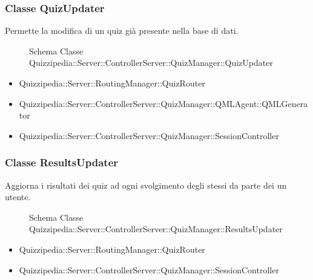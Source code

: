 \subsubsection{Classe QuizUpdater}
Permette la modifica di un quiz già presente nella base di dati.
\begin{figure}[H]
\centering
\noindent{}
\caption{Schema Classe Quizzipedia::Server::ControllerServer::QuizManager::QuizUpdater}
\end{figure}
\begin{itemize}
\item Quizzipedia::Server::RoutingManager::QuizRouter
\end{itemize}
\begin{itemize}
\item Quizzipedia::Server::ControllerServer::QuizManager::QMLAgent::QMLGenerator
\item Quizzipedia::Server::ControllerServer::QuizManager::SessionController
\end{itemize}
\subsubsection{Classe ResultsUpdater}
Aggiorna i risultati dei quiz ad ogni svolgimento degli stessi da parte dei un utente.
\begin{figure}[H]
\centering
\noindent{}
\caption{Schema Classe Quizzipedia::Server::ControllerServer::QuizManager::ResultsUpdater}
\end{figure}
\begin{itemize}
\item Quizzipedia::Server::RoutingManager::QuizRouter
\end{itemize}
\begin{itemize}
\item Quizzipedia::Server::ControllerServer::QuizManager::SessionController
\end{itemize}
